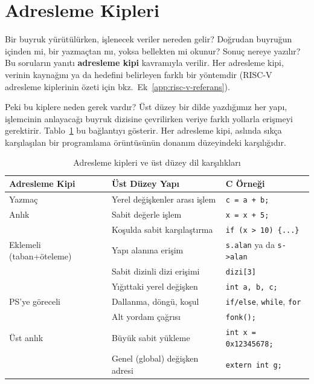 \section{Adresleme Kipleri}
\label{sec:adresleme-kipleri}

Bir buyruk yürütülürken, işlenecek veriler nereden gelir? Doğrudan buyruğun içinden mi, bir yazmaçtan mı, yoksa bellekten mi okunur? Sonuç nereye yazılır? Bu soruların yanıtı \textbf{adresleme kipi} kavramıyla verilir. Her adresleme kipi, verinin kaynağını ya da hedefini belirleyen farklı bir yöntemdir (RISC-V adresleme kiplerinin özeti için bkz.\ Ek~\ref{app:risc-v-referans}).

Peki bu kiplere neden gerek vardır? Üst düzey bir dilde yazdığımız her yapı, işlemcinin anlayacağı buyruk dizisine çevrilirken veriye farklı yollarla erişmeyi gerektirir. Tablo~\ref{tab:adresleme-kipi-motivasyon} bu bağlantıyı gösterir. Her adresleme kipi, aslında sıkça karşılaşılan bir programlama örüntüsünün donanım düzeyindeki karşılığıdır.

\begin{table}[H]
\centering
\caption{Adresleme kipleri ve üst düzey dil karşılıkları}
\label{tab:adresleme-kipi-motivasyon}
\small
\begin{tabular}{lll}
\toprule
\textbf{Adresleme Kipi} & \textbf{Üst Düzey Yapı} & \textbf{C Örneği} \\
\midrule
Yazmaç & Yerel değişkenler arası işlem & \texttt{c = a + b;} \\
Anlık & Sabit değerle işlem & \texttt{x = x + 5;} \\
 & Koşulda sabit karşılaştırma & \texttt{if (x > 10) \{...\}} \\
Eklemeli (taban+öteleme) & Yapı alanına erişim & \texttt{s.alan} ya da \texttt{s->alan} \\
 & Sabit dizinli dizi erişimi & \texttt{dizi[3]} \\
 & Yığıttaki yerel değişken & \texttt{int a, b, c;} \\
PS'ye göreceli & Dallanma, döngü, koşul & \texttt{if/else}, \texttt{while}, \texttt{for} \\
 & Alt yordam çağrısı & \texttt{fonk();} \\
Üst anlık & Büyük sabit yükleme & \texttt{int x = 0x12345678;} \\
 & Genel (global) değişken adresi & \texttt{extern int g;} \\
\bottomrule
\end{tabular}
\end{table}

